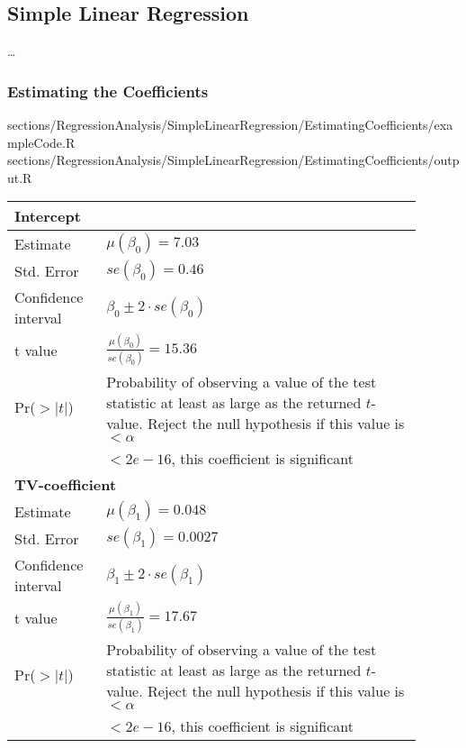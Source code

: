 \subsection{Simple Linear Regression}


\dots

\subsubsection{Estimating the Coefficients}

\RExample
	{sections/RegressionAnalysis/SimpleLinearRegression/EstimatingCoefficients/exampleCode.R}
	{sections/RegressionAnalysis/SimpleLinearRegression/EstimatingCoefficients/output.R}
	{	
		\begin{minipage}{\linewidth}
			\begin{table}[H]\centering
				\begin{tabular}{|p{0.2\linewidth}|p{0.7\linewidth}|}
					\hline
					\multicolumn{2}{|l|}{\textbf{Intercept}}\\
					\hline
					Estimate 
						& $\mu(\beta_0) = 7.03$\\
					Std. Error
						& $se(\beta_0) = 0.46$\\
					Confidence interval
						& $\beta_0 \pm 2\cdot se(\beta_0)$\\
					t value
						& $\frac{\mu(\beta_0)}{se(\beta_0)} = 15.36$\\
					Pr($>|t|$)
						& Probability of observing a value of the test statistic at least as large as the returned $t$-value. Reject the null hypothesis if this value is $<\alpha$\\
						& $<2e-16$, this coefficient is significant\\
					\hline
					\multicolumn{2}{|l|}{\textbf{TV-coefficient}}\\
					\hline
					Estimate
						& $\mu(\beta_1) = 0.048$\\
					Std. Error
						& $se(\beta_1) = 0.0027$\\
					Confidence interval
						& $\beta_1 \pm 2\cdot se(\beta_1)$\\
					t value
						& $ \frac{\mu(\beta_1)}{se(\beta_1)} = 17.67$\\
					Pr($>|t|$)
						& Probability of observing a value of the test statistic at least as large as the returned $t$-value. Reject the null hypothesis if this value is $<\alpha$\\
						& $<2e-16$, this coefficient is significant\\

\end{tabular}
\end{table}
\end{minipage}}
